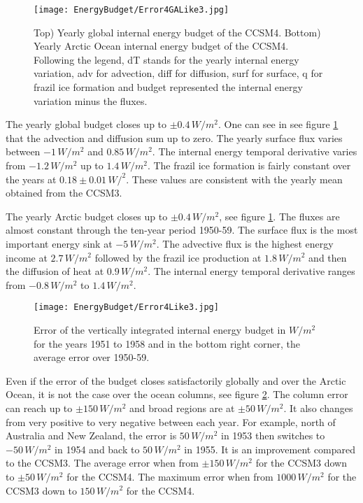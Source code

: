 
\begin{figure}[t!]
\center
\texttt{[image: EnergyBudget/Error4GALike3.jpg]}
\caption{Top) Yearly global internal energy budget of the CCSM4. Bottom) Yearly Arctic Ocean internal energy budget of the CCSM4. Following the legend, dT stands for the yearly internal energy variation, adv for advection, diff for diffusion, surf for surface, q for frazil ice formation and budget represented the internal energy variation minus the fluxes.  }
\label{err4l3}
\end{figure}

The yearly global budget closes up to $\pm 0.4 \, W/m^2$. One can see in see figure \ref{err4l3} that the advection and diffusion sum up to zero. The yearly surface flux varies between $-1 \, W/m^2$ and $0.85 \, W/m^2$. The internal energy temporal derivative varies from $-1.2 \, W/m^2$ up to $1.4 \, W/m^2$. The frazil ice formation is fairly constant over the years at $0.18 \pm 0.01 \, W/^2$. These values are consistent with the yearly mean obtained from the CCSM3. 

The yearly Arctic budget closes up to $\pm 0.4 \, W/m^2$, see figure \ref{err4l3}. The fluxes are almost constant through the ten-year period 1950-59. The surface flux is the most important energy sink at $-5 \, W/m^2$. The advective flux is the highest energy income at $2.7 \, W/m^2$ followed by the frazil ice production at $1.8 \, W/m^2$ and then the diffusion of heat at $0.9 \, W/m^2$. The internal energy temporal derivative ranges from $-0.8 \, W/m^2$ to $1.4 \, W/m^2$. 

\begin{figure}[t!]
\center
\texttt{[image: EnergyBudget/Error4Like3.jpg]}
\caption{Error of the vertically integrated internal energy budget in $W/m^2$ for the years 1951 to 1958 and in the bottom right corner, the average error over 1950-59.}
\label{column4l3}
\end{figure}

Even if the error of the budget closes satisfactorily globally and over the Arctic Ocean, it is not the case over the ocean columns, see figure \ref{column4l3}. The column error can reach up to $\pm 150\, W/m^2$ and broad regions are at $\pm 50 \, W/m^2$. It also changes from very positive to very negative between each year. For example, north of Australia and New Zealand, the error is $50 \, W/m^2$ in 1953 then switches to $-50 \, W/m^2$ in 1954 and back to $50 \, W/m^2$ in 1955. It is an improvement compared to the CCSM3. The average error when from $\pm 150\, W/m^2$ for the CCSM3 down to $\pm 50\, W/m^2$ for the CCSM4. The maximum error when from $1000\,W/m^2$ for the CCSM3 down to $150\, W/m^2$ for the CCSM4. 


